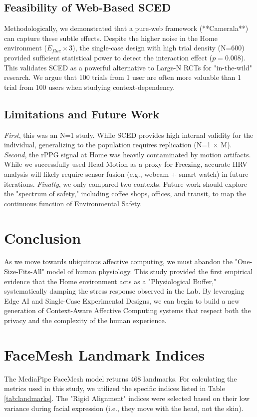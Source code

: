 \documentclass[journal]{IEEEtran}
\begin{document}
\subsection{Feasibility of Web-Based SCED}
Methodologically, we demonstrated that a pure-web framework (**Camerala**) can capture these subtle effects.
Despite the higher noise in the Home environment ($E_{fluc} \times 3$), the single-case design with high trial density (N=600) 
provided sufficient statistical power to detect the interaction effect ($p=0.008$).
This validates SCED as a powerful alternative to Large-N RCTs for "in-the-wild" research. 
We argue that 100 trials from 1 user are often more valuable than 1 trial from 100 users when studying context-dependency.

\subsection{Limitations and Future Work}
\textit{First}, this was an N=1 study. While SCED provides high internal validity for the individual, generalizing to the population requires replication (N=1 $\times$ M).
\textit{Second}, the rPPG signal at Home was heavily contaminated by motion artifacts. 
While we successfully used Head Motion as a proxy for Freezing, accurate HRV analysis will likely require sensor fusion (e.g., webcam + smart watch) in future iterations.
\textit{Finally}, we only compared two contexts. Future work should explore the "spectrum of safety," including coffee shops, offices, and transit, 
to map the continuous function of Environmental Safety.

\section{Conclusion}
As we move towards ubiquitous affective computing, we must abandon the "One-Size-Fits-All" model of human physiology. 
This study provided the first empirical evidence that the Home environment acts as a "Physiological Buffer," systematically damping the stress response 
observed in the Lab. By leveraging Edge AI and Single-Case Experimental Designs, we can begin to build a new generation of 
Context-Aware Affective Computing systems that respect both the privacy and the complexity of the human experience.

\appendices

\section{FaceMesh Landmark Indices}
The MediaPipe FaceMesh model returns 468 landmarks. For calculating the metrics used in this study, we utilized the specific indices listed in Table \ref{tab:landmarks}.
The "Rigid Alignment" indices were selected based on their low variance during facial expression (i.e., they move with the head, not the skin).



\ifCLASSOPTIONcaptionsoff
  \newpage
\fi



\end{document}
